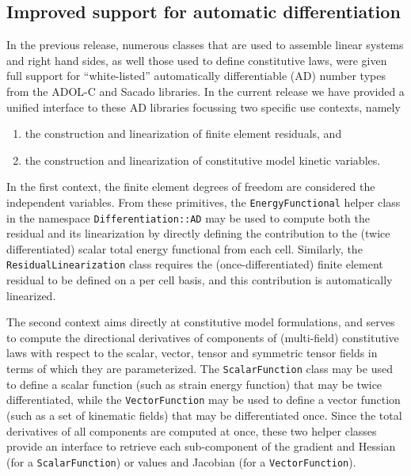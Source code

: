 \documentclass{ansarticle-preprint}
\begin{document}
\subsection{Improved support for automatic differentiation}
\label{subsec:ad}

In the previous release, numerous classes that are used to assemble linear systems
and right hand sides, as well those used to define constitutive laws, were given 
full support for ``white-listed'' automatically differentiable (AD) number types 
from the ADOL-C and Sacado libraries.
In the current release we have provided a unified interface to these
AD libraries focussing two specific use contexts, namely
\begin{enumerate}
\item the construction and linearization of finite element residuals, and
\item the construction and linearization of constitutive model kinetic variables.
\end{enumerate}

In the first context, the finite element degrees of freedom are considered the
independent variables. From these primitives, the \texttt{EnergyFunctional} helper
class in the namespace \texttt{Differentiation::AD} may be used to compute both the 
residual and its linearization by directly defining the contribution to the 
(twice differentiated) scalar total energy functional from each cell. Similarly, 
the \texttt{ResidualLinearization} class requires the (once-differentiated) finite 
element residual to be defined on a per cell basis,  and this contribution is 
automatically linearized.

The second context aims directly at constitutive model formulations, and serves to
compute the directional derivatives of components of (multi-field) constitutive laws
with respect to the scalar, vector, tensor and symmetric tensor fields in terms 
of which they are parameterized. The \texttt{ScalarFunction} class may be used to 
define a scalar function (such as strain energy function) that may be twice 
differentiated, while the \texttt{VectorFunction} may be used to define a vector
function (such as a set of kinematic fields) that may be differentiated once.
Since the total derivatives of all components are computed at once, these two helper 
classes provide an interface to retrieve each sub-component of the gradient and 
Hessian (for a \texttt{ScalarFunction}) or values and Jacobian (for a 
\texttt{VectorFunction}).
\end{document}
